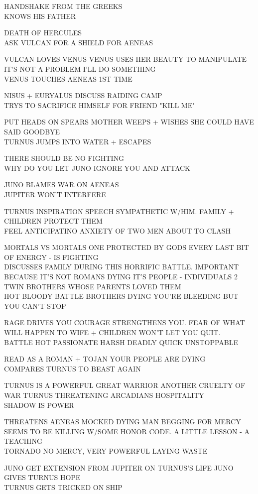 \documentclass[10pt,letterpaper]{article}
\begin{document}
HANDSHAKE FROM THE GREEKS\\
KNOWS HIS FATHER

DEATH OF HERCULES\\
ASK VULCAN FOR A SHIELD FOR AENEAS

VULCAN LOVES VENUS VENUS USES HER BEAUTY TO MANIPULATE IT'S NOT A PROBLEM I'LL DO SOMETHING\\
VENUS TOUCHES AENEAS 1ST TIME

NISUS + EURYALUS DISCUSS RAIDING CAMP\\
TRYS TO SACRIFICE HIMSELF FOR FRIEND "KILL ME"

PUT HEADS ON SPEARS MOTHER WEEPS + WISHES SHE COULD HAVE SAID GOODBYE\\
TURNUS JUMPS INTO WATER + ESCAPES

THERE SHOULD BE NO FIGHTING\\
WHY DO YOU LET JUNO IGNORE YOU AND ATTACK

JUNO BLAMES WAR ON AENEAS\\
JUPITER WON'T INTERFERE

TURNUS INSPIRATION SPEECH SYMPATHETIC W/HIM. FAMILY + CHILDREN PROTECT THEM\\
FEEL ANTICIPATINO ANXIETY OF TWO MEN ABOUT TO CLASH

MORTALS VS MORTALS ONE PROTECTED BY GODS EVERY LAST BIT OF ENERGY {-} IS FIGHTING\\
DISCUSSES FAMILY DURING THIS HORRIFIC BATTLE.  IMPORTANT BECAUSE IT'S NOT ROMANS DYING IT'S PEOPLE {-} INDIVIDUALS 2 TWIN BROTHERS WHOSE PARENTS LOVED THEM\\
HOT BLOODY BATTLE BROTHERS DYING YOU'RE BLEEDING BUT YOU CAN'T STOP

RAGE DRIVES YOU COURAGE STRENGTHENS YOU. FEAR OF WHAT WILL HAPPEN TO WIFE + CHILDREN WON'T LET YOU QUIT.\\
BATTLE HOT PASSIONATE HARSH DEADLY QUICK UNSTOPPABLE

READ AS A ROMAN + TOJAN YOUR PEOPLE ARE DYING\\
COMPARES TURNUS TO BEAST AGAIN

TURNUS IS A POWERFUL GREAT WARRIOR ANOTHER CRUELTY OF WAR TURNUS THREATENING ARCADIANS HOSPITALITY\\
SHADOW IS POWER

THREATENS AENEAS MOCKED DYING MAN BEGGING FOR MERCY SEEMS TO BE KILLING W/SOME HONOR CODE. A LITTLE LESSON {-} A TEACHING\\
TORNADO NO MERCY, VERY POWERFUL LAYING WASTE

JUNO GET EXTENSION FROM JUPITER ON TURNUS'S LIFE JUNO GIVES TURNUS HOPE\\
TURNUS GETS TRICKED ON SHIP
\end{document}

